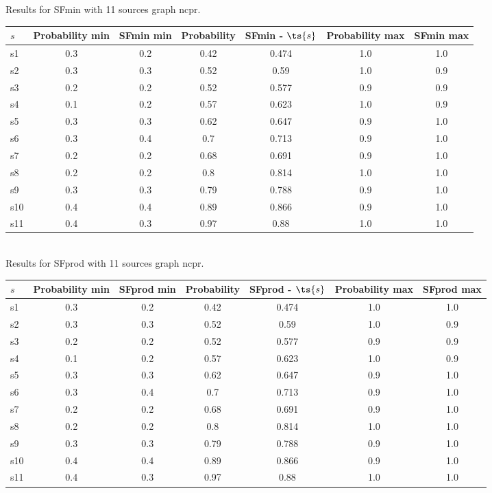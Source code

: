 \documentclass{article}
\begin{document}
\noindent Results for SFmin with 11 sources graph ncpr.

\noindent\begin{tabular}{|l|c|c|c|c|c|c|}
\hline
$s$& Probability min & SFmin min & Probability & SFmin - $\ts{s}$ & Probability max & SFmin max\\
\hline
s1 &0.3 & 0.2 & 0.42 & 0.474 & 1.0 & 1.0\\
\hline
s2 &0.3 & 0.3 & 0.52 & 0.59 & 1.0 & 0.9\\
\hline
s3 &0.2 & 0.2 & 0.52 & 0.577 & 0.9 & 0.9\\
\hline
s4 &0.1 & 0.2 & 0.57 & 0.623 & 1.0 & 0.9\\
\hline
s5 &0.3 & 0.3 & 0.62 & 0.647 & 0.9 & 1.0\\
\hline
s6 &0.3 & 0.4 & 0.7 & 0.713 & 0.9 & 1.0\\
\hline
s7 &0.2 & 0.2 & 0.68 & 0.691 & 0.9 & 1.0\\
\hline
s8 &0.2 & 0.2 & 0.8 & 0.814 & 1.0 & 1.0\\
\hline
s9 &0.3 & 0.3 & 0.79 & 0.788 & 0.9 & 1.0\\
\hline
s10 &0.4 & 0.4 & 0.89 & 0.866 & 0.9 & 1.0\\
\hline
s11 &0.4 & 0.3 & 0.97 & 0.88 & 1.0 & 1.0\\
\hline
\end{tabular}\\

\noindent Results for SFprod with 11 sources graph ncpr.

\noindent\begin{tabular}{|l|c|c|c|c|c|c|}
\hline
$s$& Probability min & SFprod min & Probability & SFprod - $\ts{s}$ & Probability max & SFprod max\\
\hline
s1 &0.3 & 0.2 & 0.42 & 0.474 & 1.0 & 1.0\\
\hline
s2 &0.3 & 0.3 & 0.52 & 0.59 & 1.0 & 0.9\\
\hline
s3 &0.2 & 0.2 & 0.52 & 0.577 & 0.9 & 0.9\\
\hline
s4 &0.1 & 0.2 & 0.57 & 0.623 & 1.0 & 0.9\\
\hline
s5 &0.3 & 0.3 & 0.62 & 0.647 & 0.9 & 1.0\\
\hline
s6 &0.3 & 0.4 & 0.7 & 0.713 & 0.9 & 1.0\\
\hline
s7 &0.2 & 0.2 & 0.68 & 0.691 & 0.9 & 1.0\\
\hline
s8 &0.2 & 0.2 & 0.8 & 0.814 & 1.0 & 1.0\\
\hline
s9 &0.3 & 0.3 & 0.79 & 0.788 & 0.9 & 1.0\\
\hline
s10 &0.4 & 0.4 & 0.89 & 0.866 & 0.9 & 1.0\\
\hline
s11 &0.4 & 0.3 & 0.97 & 0.88 & 1.0 & 1.0\\
\hline
\end{tabular}\\
\end{document}

